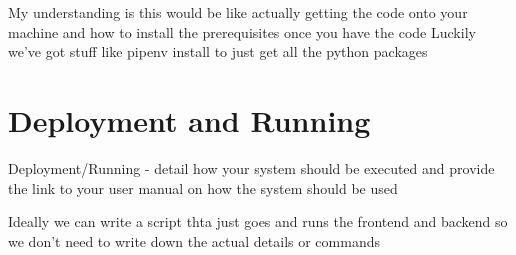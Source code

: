 \documentclass{article}
\begin{document}
My understanding is this would be like actually getting the code onto your machine and how to install the prerequisites once you have the code
Luckily we've got stuff like pipenv install to just get all the python packages


\section{Deployment and Running}
Deployment/Running - detail how your system should be executed and provide the link to your user
manual on how the system should be used

Ideally we can write a script thta just goes and runs the frontend and backend so we don't need to write down the actual details or commands
\end{document}
